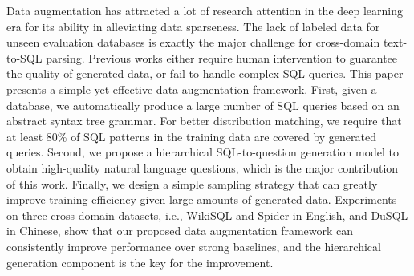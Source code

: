 Data augmentation has attracted a lot of research attention in the deep learning era for its ability in alleviating data sparseness. The lack of labeled data for unseen evaluation databases is exactly the major challenge for cross-domain text-to-SQL parsing. Previous works either require human intervention to guarantee the quality of generated data, or fail to handle complex SQL queries. This paper presents a simple yet effective data augmentation framework. First, given a database, we automatically produce a large number of SQL queries based on an abstract syntax tree grammar. For better distribution matching, we require that at least 80\% of SQL patterns in the training data are covered by generated queries. Second, we propose a hierarchical SQL-to-question generation model to obtain high-quality natural language questions, which is the major contribution of this work. Finally, we design a simple sampling strategy that can greatly improve training efficiency given large amounts of generated data. Experiments on three cross-domain datasets, i.e., WikiSQL and Spider in English, and DuSQL in Chinese, show that our proposed data augmentation framework can consistently improve performance over strong baselines, and the hierarchical generation component is the key for the improvement.
